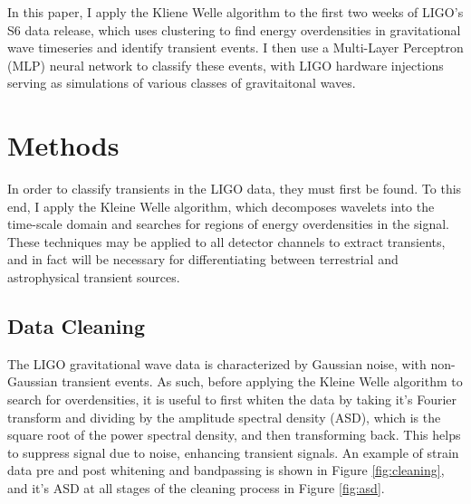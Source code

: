 \documentclass{article}
\begin{document}
In this paper, I apply the Kliene Welle algorithm\citep{Chatterji2004}\citep{Blackburn2007} to the first two weeks of LIGO's S6 data release, which uses clustering to find energy overdensities in gravitational wave timeseries and identify transient events. I then use a Multi-Layer Perceptron (MLP) neural network to classify these events, with LIGO hardware injections serving as simulations of various classes of gravitaitonal waves.

\section{Methods}
In order to classify transients in the LIGO data, they must first be found. To this end, I apply the Kleine Welle algorithm, which decomposes wavelets into the time-scale domain and searches for regions of energy overdensities in the signal\citep{Biswas2013}\cite{Blackburn2007}. These techniques may be applied to all detector channels to extract transients, and in fact will be necessary for differentiating between terrestrial and astrophysical transient sources.

\subsection{Data Cleaning}
The LIGO gravitational wave data is characterized by Gaussian noise, with non-Gaussian transient events. As such, before applying the Kleine Welle algorithm to search for overdensities, it is useful to first whiten the data by taking it's Fourier transform and dividing by the amplitude spectral density (ASD), which is the square root of the power spectral density, and then transforming back\citep{LIGOScientificCollaboration}. This helps to suppress signal due to noise, enhancing transient signals. An example of strain data pre and post whitening and bandpassing is shown in Figure \ref{fig:cleaning}, and it's ASD at all stages of the cleaning process in Figure \ref{fig:asd}.
\end{document}
